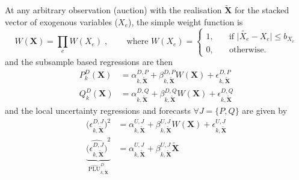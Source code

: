 At any arbitrary observation (auction) with the realisation $\boldsymbol{\tilde{X}}$ for the stacked vector of exogenous variables ($X_e$), the simple weight function is 
\begin{equation}
W(\boldsymbol{X}) =  \prod_{e} W(X_e) \; \text{,} \quad  \quad  \text{ where  } 
W(X_e) = \begin{cases} 1, \quad & \mbox{if } \vert \tilde{X_e} - X_e \vert \leq b_{X_e} 
\\ 
0, \quad & \mbox{otherwise. } \end{cases}
\end{equation}
and the subsample based regressions are then
\begin{align}
P^D_k(\boldsymbol{X}) &= \alpha^{D,P}_{k,\boldsymbol{\tilde{X}}} + \beta^{D,P}_{k,\boldsymbol{\tilde{X}}} W(\boldsymbol{X}) + \epsilon^{D,P}_{k,\boldsymbol{\tilde{X}}} \\
Q^D_k(\boldsymbol{X}) &= \alpha^{D,Q}_{k,\boldsymbol{\tilde{X}}} + \beta^{D,Q}_{k,\boldsymbol{\tilde{X}}} W(\boldsymbol{X}) + \epsilon^{D,Q}_{k,\boldsymbol{\tilde{X}}} 
\end{align}
and the local uncertainty regressions and forecasts $\forall J=\{P,Q\} $ are given  by
\begin{align}
\bigl(\epsilon^{D,J}_{k,\boldsymbol{\tilde{X}}}\bigr)^2 &= \alpha^{U,J}_{k,\boldsymbol{\tilde{X}}} + \beta^{U,J}_{k,\boldsymbol{\tilde{X}}} W(\boldsymbol{X})  + \epsilon^{U,J}_{k,\boldsymbol{\tilde{X}}} \\
%
\underbrace{\widehat{\bigl(\epsilon^{D,J}_{k,\boldsymbol{\tilde{X}}}\bigr)}^2}_{\widehat{\text{PLU}}^D_{k, \boldsymbol{\tilde{X}}}} &= \alpha^{U,J}_{k,\boldsymbol{\tilde{X}}} + \beta^{U,J}_{k,\boldsymbol{\tilde{X}}} \boldsymbol{\tilde{X}}
\end{align}

